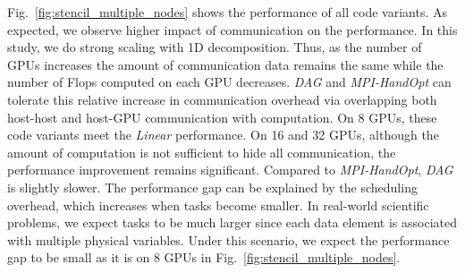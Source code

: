 Fig.~\ref{fig:stencil_multiple_nodes} shows the performance of all code variants.
As expected, we observe higher impact of communication on the performance.
In this study, we do strong scaling with 1D decomposition.
Thus, as the number of GPUs increases the amount of communication data remains the same while the number of Flops computed on each GPU decreases.
{\em DAG} and {\em MPI-HandOpt} can tolerate this relative increase in communication overhead via overlapping both host-host and host-GPU communication with computation.
On 8 GPUs, these code variants meet the {\em Linear} performance.
On 16 and 32 GPUs, although the amount of computation is not sufficient to hide all communication, the performance improvement remains significant.
Compared to {\em MPI-HandOpt}, {\em DAG} is slightly slower.
The performance gap can be explained by the scheduling overhead, which increases when tasks become smaller.
In real-world scientific problems, we expect tasks to be much larger since each data element is associated with multiple physical variables. 
Under this scenario, we expect the performance gap to be small as it is on 8 GPUs in Fig.~\ref{fig:stencil_multiple_nodes}.





